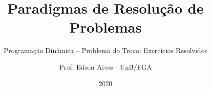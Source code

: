 \title{Paradigmas de Resolução de Problemas}
\subtitle{Programação Dinâmica -- Problema do Troco: Exercícios Resolvidos}
\author{Prof. Edson Alves - UnB/FGA}
\date{2020}
